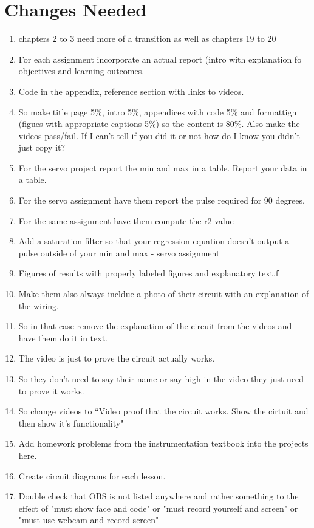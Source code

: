 \section{Changes Needed}
\begin{enumerate}[itemsep=-5pt]
\item chapters 2 to 3 need more of a transition as well as chapters 19 to 20
\item For each assignment incorporate an actual report (intro with explanation fo objectives and learning outcomes.
\item Code in the appendix, reference section with links to videos.
\item So make title page 5\%, intro 5\%, appendices with code 5\% and formattign (figues with appropriate captions 5\%) so the content is 80\%. Also make the videos pass/fail. If I can't tell if you did it or not how do I know you didn't just copy it?
\item For the servo project report the min and max in a table. Report your data in a table.
\item For the servo assignment have them report the pulse required for 90 degrees.
\item For the same assignment have them compute the r2 value
\item Add a saturation filter so that your regression equation doesn't output a pulse outside of your min and max - servo assignment
\item Figures of results with properly labeled figures and explanatory text.f
\item Make them also always incldue a photo of their circuit with an explanation of the wiring.
\item So in that case remove the explanation of the circuit from the videos and have them do it in text.
\item The video is just to prove the circuit actually works.
\item So they don't need to say their name or say high in the video they just need to prove it works.
\item So change videos to ``Video proof that the circuit works. Show the cirtuit and then show it's functionality"
\item Add homework problems from the instrumentation textbook into the projects here. 
\item Create circuit diagrams for each lesson.
\item Double check that OBS is not listed anywhere and rather something to the effect of "must show face and code" or "must record yourself and screen" or "must use webcam and record screen"

\end{enumerate}
